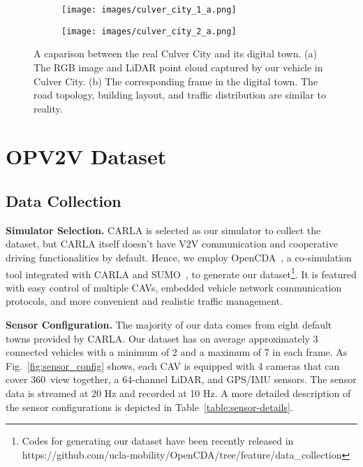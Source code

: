 \begin{figure}
    \centering
    \begin{subfigure}[c]{1\linewidth}
        \centering\texttt{[image: images/culver\_city\_1\_a.png]}
        \caption{}
    \end{subfigure}
    \begin{subfigure}[c]{1\linewidth}
        \centering\texttt{[image: images/culver\_city\_2\_a.png]}
        \caption{}
    \end{subfigure}
    \caption{A caparison between the real Culver City and its digital town. (a) The RGB image and LiDAR point cloud captured by our vehicle in Culver City. (b) The corresponding frame in the digital town. The road topology, building layout, and traffic distribution are similar to reality.  }
    \label{fig:culver}
\end{figure}

\section{OPV2V Dataset}
\subsection{Data Collection}
\noindent\textbf{Simulator Selection.} CARLA is selected as our simulator to collect the dataset, but CARLA itself doesn't have V2V communication and cooperative driving functionalities by default. Hence, we employ OpenCDA~\cite{xu2021opencda}, a co-simulation tool integrated with CARLA and SUMO~\cite{OlaverriMonreal2018ConnectionOT}, to generate our dataset\footnote{Codes for generating our dataset have been recently released in https://github.com/ucla-mobility/OpenCDA/tree/feature/data\_collection}. It is featured with easy control of multiple CAVs, embedded vehicle network communication protocols, and more convenient and realistic traffic management.  

\noindent\textbf{Sensor Configuration.} The majority of our data comes from eight default towns provided by CARLA.  Our dataset has on average approximately 3 connected vehicles with a minimum of 2 and a maximum of 7 in each frame. As Fig.~\ref{fig:sensor_config} shows, each CAV is equipped with 4 cameras that can cover 360\degree~view together, a 64-channel LiDAR, and GPS/IMU sensors.  The sensor data is streamed at 20 Hz and recorded at 10 Hz. A more detailed description of the sensor configurations is depicted in Table~\ref{table:sensor-details}.

